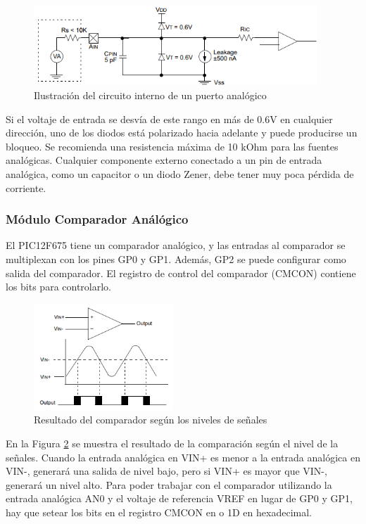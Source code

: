 \documentclass[a4paper]{article}
\begin{document}
\begin{figure}[h]\centering
    \includegraphics[height=3cm]{informefig4.png}
    \caption{Ilustración del circuito interno de un puerto analógico}
    \label{fig:analog-pin}
\end{figure}

Si el voltaje de entrada se desvía de este rango en más de 0.6V
en cualquier dirección, uno de los diodos está polarizado hacia adelante
y puede producirse un bloqueo. Se recomienda una resistencia máxima de 10 kOhm para las fuentes analógicas.
Cualquier componente externo conectado a un pin de entrada analógica,
como un capacitor o un diodo Zener, debe tener muy poca pérdida de corriente.

\subsubsection*{Módulo Comparador Análógico}

El PIC12F675 tiene un comparador analógico, y las entradas al
comparador se multiplexan con los pines GP0 y GP1.
Además, GP2 se puede configurar como salida del comparador.
El registro de control del comparador (CMCON) contiene
los bits para controlarlo.
		
\begin{figure}[h]\centering
    \includegraphics[height=4cm]{informefig3.png}
    \caption{Resultado del comparador según los niveles de señales}
    \label{fig:analog-signal}
\end{figure}

En la Figura \ref{fig:analog-signal} se muestra el resultado de la 
comparación según el nivel de la señales. Cuando la entrada 
analógica en VIN+ es menor a la entrada
analógica en VIN-, generará una salida de nivel bajo, pero si VIN+
es mayor que VIN-, generará un nivel alto.
Para poder trabajar con el comparador
utilizando la entrada analógica AN0 y el voltaje de referencia VREF 
en lugar de GP0 y GP1, hay que setear los bits en el registro CMCON 
en {} o {\ttfamily 1D} en hexadecimal.
\end{document}
